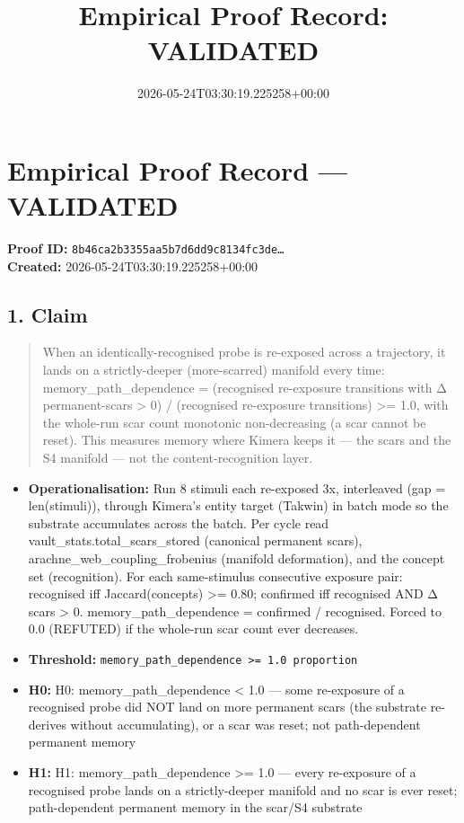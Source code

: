 \documentclass{article}
\title{Empirical Proof Record: VALIDATED}
\date{2026-05-24T03:30:19.225258+00:00}
\begin{document}
\maketitle
\section*{Empirical Proof Record --- \textcolor{validated}{\textbf{VALIDATED}}}
\textbf{Proof ID:} \texttt{8b46ca2b3355aa5b7d6dd9c8134fc3de\dots}\\
\textbf{Created:} 2026-05-24T03:30:19.225258+00:00
\subsection*{1. Claim}
\begin{quote}When an identically-recognised probe is re-exposed across a trajectory, it lands on a strictly-deeper (more-scarred) manifold every time: memory\_path\_dependence = (recognised re-exposure transitions with Δ permanent-scars > 0) / (recognised re-exposure transitions) >= 1.0, with the whole-run scar count monotonic non-decreasing (a scar cannot be reset). This measures memory where Kimera keeps it — the scars and the S4 manifold — not the content-recognition layer.\end{quote}
\begin{itemize}
\item \textbf{Operationalisation:} Run 8 stimuli each re-exposed 3x, interleaved (gap = len(stimuli)), through Kimera's entity target (Takwin) in batch mode so the substrate accumulates across the batch. Per cycle read vault\_stats.total\_scars\_stored (canonical permanent scars), arachne\_web\_coupling\_frobenius (manifold deformation), and the concept set (recognition). For each same-stimulus consecutive exposure pair: recognised iff Jaccard(concepts) >= 0.80; confirmed iff recognised AND Δ scars > 0. memory\_path\_dependence = confirmed / recognised. Forced to 0.0 (REFUTED) if the whole-run scar count ever decreases.
\item \textbf{Threshold:} \texttt{memory\_path\_dependence >= 1.0 proportion}
\item \textbf{H0:} H0: memory\_path\_dependence < 1.0 — some re-exposure of a recognised probe did NOT land on more permanent scars (the substrate re-derives without accumulating), or a scar was reset; not path-dependent permanent memory
\item \textbf{H1:} H1: memory\_path\_dependence >= 1.0 — every re-exposure of a recognised probe lands on a strictly-deeper manifold and no scar is ever reset; path-dependent permanent memory in the scar/S4 substrate
\end{itemize}
\end{document}
